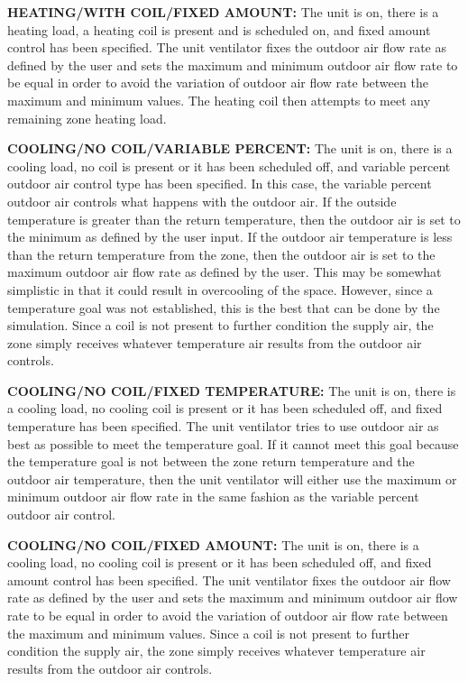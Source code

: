 \textbf{HEATING/WITH COIL/FIXED AMOUNT:} The unit is on, there is a heating load, a heating coil is present and is scheduled on, and fixed amount control has been specified. The unit ventilator fixes the outdoor air flow rate as defined by the user and sets the maximum and minimum outdoor air flow rate to be equal in order to avoid the variation of outdoor air flow rate between the maximum and minimum values. The heating coil then attempts to meet any remaining zone heating load.

\textbf{COOLING/NO COIL/VARIABLE PERCENT:} The unit is on, there is a cooling load, no coil is present or it has been scheduled off, and variable percent outdoor air control type has been specified. In this case, the variable percent outdoor air controls what happens with the outdoor air. If the outside temperature is greater than the return temperature, then the outdoor air is set to the minimum as defined by the user input. If the outdoor air temperature is less than the return temperature from the zone, then the outdoor air is set to the maximum outdoor air flow rate as defined by the user. This may be somewhat simplistic in that it could result in overcooling of the space. However, since a temperature goal was not established, this is the best that can be done by the simulation. Since a coil is not present to further condition the supply air, the zone simply receives whatever temperature air results from the outdoor air controls.

\textbf{COOLING/NO COIL/FIXED TEMPERATURE:} The unit is on, there is a cooling load, no cooling coil is present or it has been scheduled off, and fixed temperature has been specified. The unit ventilator tries to use outdoor air as best as possible to meet the temperature goal. If it cannot meet this goal because the temperature goal is not between the zone return temperature and the outdoor air temperature, then the unit ventilator will either use the maximum or minimum outdoor air flow rate in the same fashion as the variable percent outdoor air control.

\textbf{COOLING/NO COIL/FIXED AMOUNT:} The unit is on, there is a cooling load, no cooling coil is present or it has been scheduled off, and fixed amount control has been specified. The unit ventilator fixes the outdoor air flow rate as defined by the user and sets the maximum and minimum outdoor air flow rate to be equal in order to avoid the variation of outdoor air flow rate between the maximum and minimum values. Since a coil is not present to further condition the supply air, the zone simply receives whatever temperature air results from the outdoor air controls.

